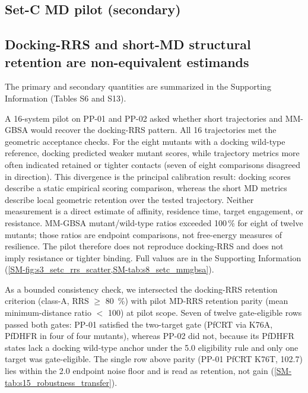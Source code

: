 \documentclass[journal=jcisd8,manuscript=article,layout=traditional]{achemso}
\begin{document}
\subsection{Set-C MD pilot (secondary)}
\label{sec:setc_pilot}

\subsection{Docking-RRS and short-MD structural retention are non-equivalent estimands}\label{sec:non_equiv_estimands}

The primary and secondary quantities are summarized in the Supporting Information (Tables S6 and S13).

A 16-system pilot on PP-01 and PP-02 asked whether short trajectories and MM-GBSA would recover the docking-RRS pattern. All 16 trajectories met the geometric acceptance checks. For the eight mutants with a docking wild-type reference, docking predicted weaker mutant scores, while trajectory metrics more often indicated retained or tighter contacts (seven of eight comparisons disagreed in direction). This divergence is the principal calibration result: docking scores describe a static empirical scoring comparison, whereas the short MD metrics describe local geometric retention over the tested trajectory. Neither measurement is a direct estimate of affinity, residence time, target engagement, or resistance. MM-GBSA mutant/wild-type ratios exceeded \num{100}\,\% for eight of twelve mutants; those ratios are endpoint comparisons, not free-energy measures of resilience. The pilot therefore does not reproduce docking-RRS and does not imply resistance or tighter binding. Full values are in the Supporting Information (\cref{SM-fig:s3_setc_rrs_scatter,SM-tab:s8_setc_mmgbsa}).

As a bounded consistency check, we intersected the docking-RRS retention criterion (class-A, RRS $\geq$ \qty{80}{\percent}) with pilot MD-RRS retention parity (mean minimum-distance ratio $<$ \num{100}) at pilot scope. Seven of twelve gate-eligible rows passed both gates: PP-01 satisfied the two-target gate (PfCRT via K76A, PfDHFR in four of four mutants), whereas PP-02 did not, because its PfDHFR states lack a docking wild-type anchor under the \qty{5.0}{\kcalmol} eligibility rule and only one target was gate-eligible. The single row above parity (PP-01 PfCRT K76T, \num{102.7}) lies within the \qty{2.0}{\kcalmol} endpoint noise floor and is read as retention, not gain (\cref{SM-tab:s15_robustness_transfer}).
\end{document}
